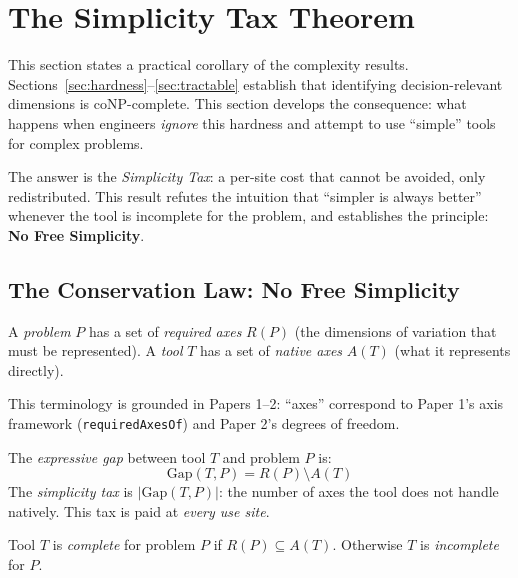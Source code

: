 \section{The Simplicity Tax Theorem}\label{sec:simplicity-tax}

This section states a practical corollary of the complexity results. Sections~\ref{sec:hardness}--\ref{sec:tractable} establish that identifying decision-relevant dimensions is coNP-complete. This section develops the consequence: what happens when engineers \emph{ignore} this hardness and attempt to use ``simple'' tools for complex problems.

The answer is the \emph{Simplicity Tax}: a per-site cost that cannot be avoided, only redistributed. This result refutes the intuition that ``simpler is always better'' whenever the tool is incomplete for the problem, and establishes the principle: \textbf{No Free Simplicity}.

\subsection{The Conservation Law: No Free Simplicity}\label{sec:conservation}

\begin{definition}\label{def:problem-tool}
A \emph{problem} $P$ has a set of \emph{required axes} $R(P)$ (the dimensions of variation that must be represented). A \emph{tool} $T$ has a set of \emph{native axes} $A(T)$ (what it represents directly).
\end{definition}

This terminology is grounded in Papers 1--2: ``axes'' correspond to Paper 1's axis framework (\texttt{requiredAxesOf}) and Paper 2's degrees of freedom.

\begin{definition}\label{def:expressive-gap}
The \emph{expressive gap} between tool $T$ and problem $P$ is:
\[\text{Gap}(T, P) = R(P) \setminus A(T)\]
The \emph{simplicity tax} is $|\text{Gap}(T, P)|$: the number of axes the tool does not handle natively. This tax is paid at \emph{every use site}.
\end{definition}

\begin{definition}\label{def:complete-incomplete}
Tool $T$ is \emph{complete} for problem $P$ if $R(P) \subseteq A(T)$. Otherwise $T$ is \emph{incomplete} for $P$.
\end{definition}

